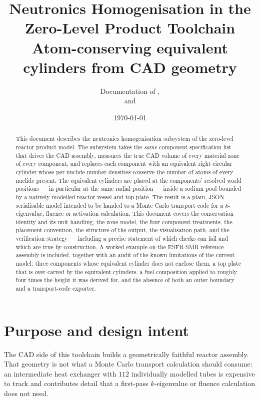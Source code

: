 \documentclass[9pt,a4paper]{extarticle}
\title{\textbf{Neutronics Homogenisation in the Zero-Level Product Toolchain}\\[0.4em]
       \large Atom-conserving equivalent cylinders from CAD geometry}
\author{Documentation of \file{homogenise.py}, \file{homogenise\_assembly.py}\\
        and \file{component\_material\_zones.py}}
\date{\today}
\begin{document}
\maketitle

\begin{abstract}
\noindent
This document describes the neutronics homogenisation subsystem of the
zero-level reactor product model. The subsystem takes the \emph{same} component
specification list that drives the CAD assembly, measures the true CAD volume of
every material zone of every component, and replaces each component with an
equivalent right circular cylinder whose per-nuclide number densities conserve
the number of atoms of every nuclide present. The equivalent cylinders are
placed at the components' resolved world positions --- in particular at the same
radial position --- inside a sodium pool bounded by a natively modelled reactor
vessel and top plate. The result is a plain, JSON-serialisable model intended to
be handed to a Monte Carlo transport code for a $k$-eigenvalue, fluence or
activation calculation. This document covers the conservation identity and its
unit handling, the zone model, the four component treatments, the placement
convention, the structure of the output, the visualisation path, and the
verification strategy --- including a precise statement of which checks can fail
and which are true by construction. A worked example on the ESFR-SMR reference
assembly is included, together with an audit of the known limitations of the
current model: three components whose equivalent cylinder does not enclose them,
a top plate that is over-carved by the equivalent cylinders, a fuel composition
applied to roughly four times the height it was derived for, and the absence
of both an outer boundary and a transport-code exporter.
\end{abstract}

\tableofcontents
\medskip

\section{Purpose and design intent}

The CAD side of this toolchain builds a geometrically faithful reactor assembly.
That geometry is not what a Monte Carlo transport calculation should consume: an
intermediate heat exchanger with $112$ individually modelled tubes is expensive
to track and contributes detail that a first-pass $k$-eigenvalue or fluence
calculation does not need.
\end{document}
